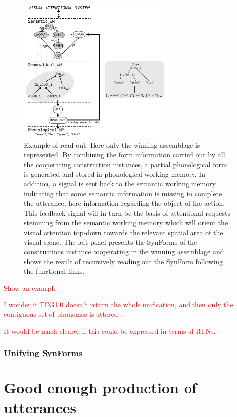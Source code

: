 \documentclass{article}
\newcommand\todo[1]{\textcolor{red}{#1}}
\begin{document}
\begin{figure}
	\centering
	\includegraphics[width=3.0in]{Figures/ReadOut.png}
	\caption{Example of read out. Here only the winning assemblage is represented. By combining the form information carried out by all the cooperating construction instances, a partial phonological form is generated and stored in phonological working memory. In addition, a signal is sent back to the semantic working memory indicating that some semantic information is missing to complete the utterance, here information regarding the object of the action. This feedback signal will in turn be the basis of attentional requests stemming from the semantic working memory which will orient the visual attention top-down towards the relevant spatial area of the visual scene. The left panel presents the SynForms of the constructions instance cooperating in the winning assemblage and shows the result of recursively reading out the SynForm following the functional links.}
	\label{fig:readout}
\end{figure}

\todo{Show an example}

\todo{I wonder if TCG1.0 doesn't return the whole unification, and then only the contiguous set of phonemes is uttered...}

\todo{It would be much clearer if this could be expressed in terms of RTNs.}

\subsubsection{Unifying SynForms}

\section{Good enough production of utterances}
\end{document}
